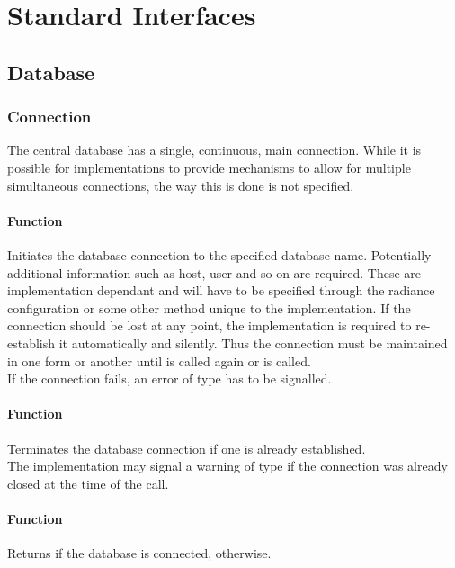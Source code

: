 \chapter{Standard Interfaces} \label{sec:standard interfaces}
\section{Database}
\subsection{Connection}
The central database has a single, continuous, main connection. While it is possible for implementations to provide mechanisms to allow for multiple simultaneous connections, the way this is done is not specified.

\subsubsection{Function }
Initiates the database connection to the specified database name. Potentially additional information such as host, user and so on are required. These are implementation dependant and will have to be specified through the radiance configuration or some other method unique to the implementation. If the connection should be lost at any point, the implementation is required to re-establish it automatically and silently. Thus the connection must be maintained in one form or another until  is called again or  is called. \\

\noindent If the connection fails, an error of type  has to be signalled.

\subsubsection{Function }
Terminates the database connection if one is already established. \\

\noindent The implementation may signal a warning of type  if the connection was already closed at the time of the call.

\subsubsection{Function }
Returns  if the database is connected,  otherwise.

